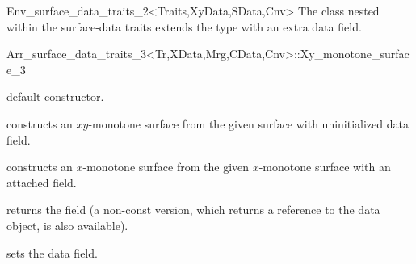 \begin{ccRefClass}{Env_surface_data_traits_2<Traits,XyData,SData,Cnv>}
The  class nested within the surface-data traits
extends the  type with an extra data
field.

\begin{ccClass}{Arr_surface_data_traits_3<Tr,XData,Mrg,CData,Cnv>::Xy_monotone_surface_3}

\ccInheritsFrom

\ccCreation
{}

    {default constructor.}

    {constructs an $xy$-monotone surface from the given  surface with
     uninitialized data field.}

    {constructs an $x$-monotone surface from the given  $x$-monotone
     surface with an attached  field.}

\ccAccessFunctions

  {returns the field (a non-const version, which returns a reference
   to the data object, is also available).}

  {sets the data field.}

\end{ccClass}

\end{ccRefClass}

\ccRefPageEnd
